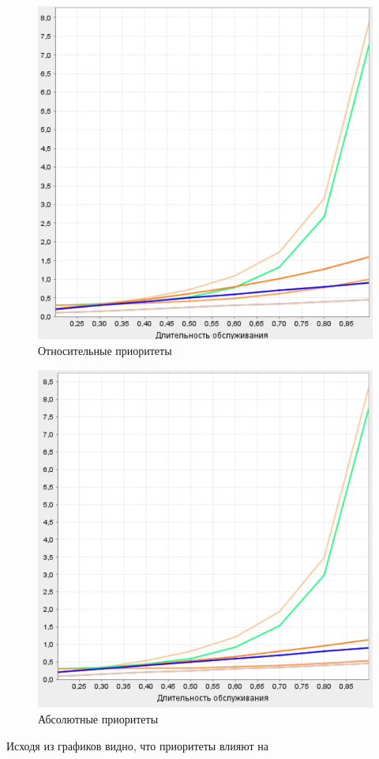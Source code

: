 \begin{figure}
\centering
\includegraphics[resolution=200]{img/op.png}
\caption{Относительные приоритеты}
\end{figure}

\begin{figure}
\centering
\includegraphics[resolution=200]{img/ap.png}
\caption{Абсолютные приоритеты}
\end{figure}

Исходя из графиков видно, что приоритеты влияют на

